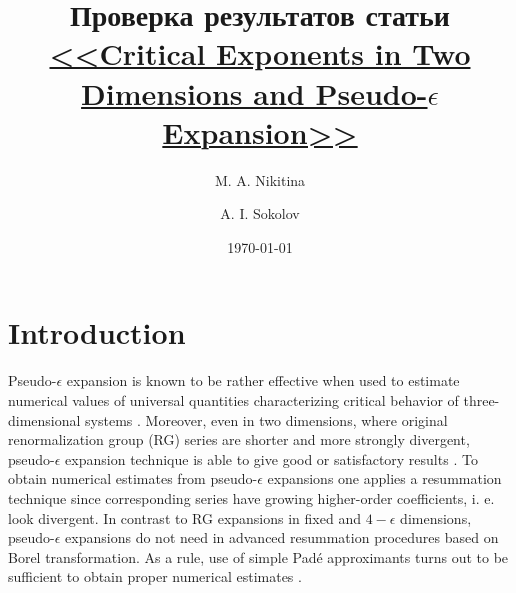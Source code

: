 \documentclass[preprint,preprintnumbers,amsmath,amssymb]{revtex4}
\newcommand{\comment}[1]{} %
\begin{document}
\title{Проверка результатов статьи \\ 
\href{http://arxiv.org/abs/1312.1062}{<<Critical Exponents in Two Dimensions and Pseudo-$\epsilon$ Expansion>>}}
\author{M. A. Nikitina}
\author{A. I. Sokolov}
\date{\today}

\comment{
\begin{abstract}
The critical behavior of two-dimensional $n$-vector $\lambda\phi^4$ field model
is studied within the framework of pseudo-$\epsilon$ expansion approach.
Pseudo-$\epsilon$ expansions for Wilson fixed point location $g^*$ and critical
exponents originating from five-loop 2D renormalization group series are derived.
Numerical estimates obtained within Pad\'e and Pad\'e-Borel resummation procedures
as well as by direct summation are presented for $n = 1$, $n = 0$ and $n = -1$,
i. e. for physically interesting models which are exactly solvable.
The pseudo-$\epsilon$ expansions for $g^*$, critical exponents $\gamma$ and $\nu$
have small lower-order coefficients and slow increasing higher-order ones. As a
result, direct summation of these series with optimal cut off provides numerical
estimates that are no worse than those given by the resummation approaches
mentioned. This enables one to consider the pseudo-$\epsilon$ expansion technique
itself as some specific resummation method.
\end{abstract}

\pacs{05.10.Cc, 05.70.Jk, 64.60.ae, 64.60.Fr}
}
\maketitle

\section{Introduction}

Pseudo-$\epsilon$ expansion is known to be rather effective when used to
estimate numerical values of universal quantities characterizing critical
behavior of three-dimensional systems \cite{GZJ1980, GZJ1998, FHY2000, HID2004}.
Moreover, even in two dimensions, where original renormalization group (RG)
series are shorter and more strongly divergent, pseudo-$\epsilon$ expansion
technique is able to give good or satisfactory results \cite{GZJ1980, COPS2004,
S2005}. To obtain numerical estimates from pseudo-$\epsilon$ expansions one
applies a resummation technique since corresponding series have growing
higher-order coefficients, i. e. look divergent. In contrast to RG expansions in
fixed and $4-\epsilon$ dimensions, pseudo-$\epsilon$ expansions do not need in
advanced resummation procedures based on Borel transformation. As a rule, use of
simple Pad\'e approximants turns out to be sufficient to obtain proper numerical
estimates \cite{FHY2000, COPS2004, S2005}.
\end{document}
